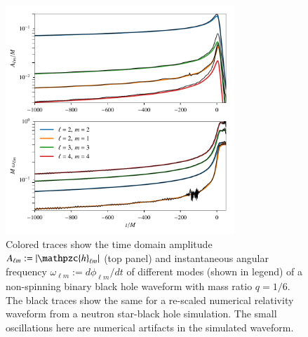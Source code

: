 \documentclass[prd,preprintnumbers,twocolumn,eqsecnum,floatfix,a4paper,nofootinbib,superscriptaddress]{revtex4}
\newcommand{\hlm}{\mathpzc{h}_{\ell m}}
\begin{document}
\begin{figure}[htb] 
\begin{center}
\includegraphics[width=3.4in]{figs/BBH_NSBH_waveforms.pdf}
\end{center} 
\caption{Colored traces show the time domain amplitude $A_{\ell m} := |\hlm|$ (top panel) and instantaneous angular frequency $\omega_{\ell m} := d\phi_{\ell m}/dt$ of different modes (shown in legend) of a non-spinning binary black hole waveform with mass ratio $q = 1/6$. The black traces show the same for a re-scaled numerical relativity waveform from a neutron star-black hole simulation. The small oscillations here are numerical artifacts in the simulated waveform.}
\label{fig:bbh_nsbh_waveforms}
\end{figure}
\end{document}
